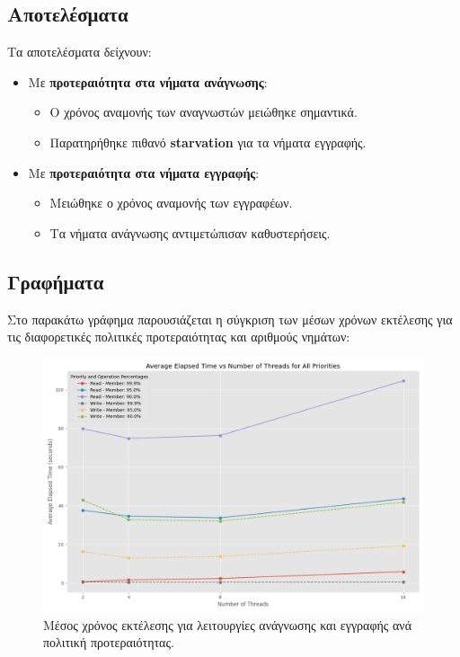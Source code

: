 \documentclass{article}
\begin{document}
\subsection*{Αποτελέσματα}
Τα αποτελέσματα δείχνουν:
\begin{itemize}
    \item Με \textbf{προτεραιότητα στα νήματα ανάγνωσης}:
    \begin{itemize}
        \item Ο χρόνος αναμονής των αναγνωστών μειώθηκε σημαντικά.
        \item Παρατηρήθηκε πιθανό \textbf{starvation} για τα νήματα εγγραφής.
    \end{itemize}
    \item Με \textbf{προτεραιότητα στα νήματα εγγραφής}:
    \begin{itemize}
        \item Μειώθηκε ο χρόνος αναμονής των εγγραφέων.
        \item Τα νήματα ανάγνωσης αντιμετώπισαν καθυστερήσεις.
    \end{itemize}
\end{itemize}
\subsection*{Γραφήματα}
Στο παρακάτω γράφημα παρουσιάζεται η σύγκριση των μέσων χρόνων εκτέλεσης για τις διαφορετικές πολιτικές προτεραιότητας και αριθμούς νημάτων:
\newpage
\begin{figure}[h]
    \centering
    \includegraphics[width=1\textwidth]{rw_lock_results.png}
    \caption{Μέσος χρόνος εκτέλεσης για λειτουργίες ανάγνωσης και εγγραφής ανά πολιτική προτεραιότητας.}
\end{figure}
\end{document}
